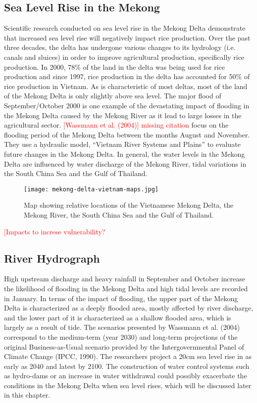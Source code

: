 \subsection{Sea Level Rise in the Mekong}

Scientific research conducted on sea level rise in the Mekong Delta demonstrate that increased sea level rise will negatively impact rice production. Over the past three decades, the delta has undergone various changes to its hydrology (i.e. canals and sluices) in order to improve agricultural production, specifically rice production. In 2000, 78\% of the land in the delta was being used for rice production and since 1997, rice production in the delta has accounted for 50\% of rice production in Vietnam. As is characteristic of most deltas, most of the land of the Mekong Delta is only slightly above sea level. The major flood of September/October 2000 is one example of the devastating impact of flooding in the Mekong Delta caused by the Mekong River as it lead to large losses in the agricultural sector. \textcolor{red}{[Wassmann et al. (2004)] missing citation} focus on the flooding period of the Mekong Delta between the months August and November. They use a hydraulic model, ``Vietnam River Systems and Plains''  to evaluate future changes in the Mekong Delta. In general, the water levels in the Mekong Delta are influenced by water discharge of the Mekong River, tidal variations in the South China Sea and the Gulf of Thailand. 

\begin{figure}
\texttt{[image: mekong-delta-vietnam-maps.jpg]}
\caption{Map showing relative locations of the Vietnamese Mekong Delta, the Mekong River, the South China Sea and the Gulf of Thailand.}
\end{figure}


\textcolor{red}{[Impacts to increse vulnerability?}

\subsection{River Hydrograph}

  High upstream discharge and heavy rainfall in September and October increase the likelihood of flooding in the Mekong Delta and high tidal levels are recorded in January. In terms of the impact of flooding, the upper part of the Mekong Delta is characterized as a deeply flooded area, mostly affected by river discharge, and the lower part of it is characterized as a shallow flooded area, which is largely as a result of tide. The scenarios presented by Wassmann et al. (2004) correspond to the medium-term (year 2030) and long-term projections  of the original Business-as-Usual scenario provided by the Intergovernmental Panel of Climate Change (IPCC, 1990). The researchers project a 20cm sea level rise in as early as 2040 and latest by 2100. The construction of water control systems such as hydro-dams or an increase in water withdrawal could possibly exacerbate the conditions in the Mekong Delta when sea level rises, which will be discussed later in this chapter.

